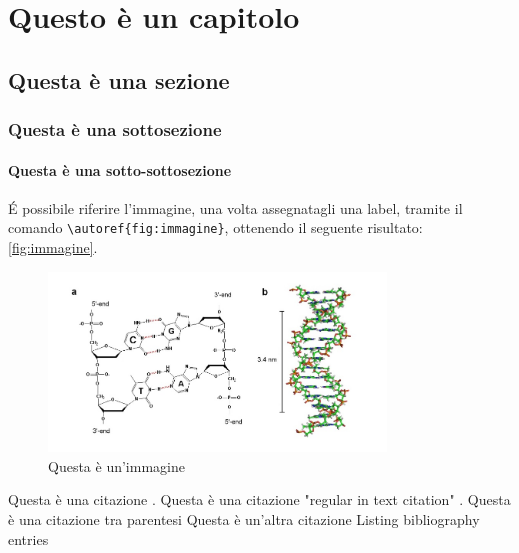 \chapter{Questo è un capitolo}

\lipsum[1]

\section{Questa è una sezione}

\lipsum[2]

\subsection{Questa è una sottosezione}

\lipsum[3]

\subsubsection{Questa è una sotto-sottosezione}

\lipsum[4]

É possibile riferire l'immagine, una volta assegnatagli una label, tramite il comando \texttt{\textbackslash autoref\{fig:immagine\}}, ottenendo il seguente risultato: \autoref{fig:immagine}.

\begin{figure}
    \centering
    \includegraphics[width=0.8\textwidth]{images/Capitolo1/immagine.jpg} %
    \caption{Questa è un'immagine} 
    \label{fig:immagine} %
\end{figure}

Questa è una citazione \cite{warstadt2020blimp}.
Questa è una citazione "regular in text citation" \citet{warstadt2020blimp}.  %
Questa è una citazione tra parentesi \citep{warstadt2020blimp}
Questa è un'altra citazione \citep{wei2021frequency}
Listing bibliography entries \citep{hu2020systematic, lau2020furiously,  sprouse2016experimental}

